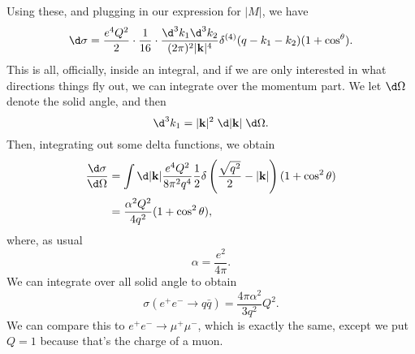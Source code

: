 \documentclass[a4paper]{article}
\begin{document}
Using these, and plugging in our expression for $|M|$, we have
\[
  \d \sigma = \frac{e^4 Q^2}{2} \cdot \frac{1}{16} \cdot \frac{\d^3 k_1 \d^3 k_2}{(2\pi)^2|\mathbf{k}|^4} \delta^{(4)} (q - k_1 - k_2) (1 + \cos^\theta).
\]
This is all, officially, inside an integral, and if we are only interested in what directions things fly out, we can integrate over the momentum part. We let $\d \Omega$ denote the solid angle, and then
\[
  \d^3 k_1 = |\mathbf{k}|^2 \;\d |\mathbf{k}|\;\d \Omega.
\]
Then, integrating out some delta functions, we obtain
\begin{align*}
  \frac{\d \sigma}{\d \Omega} &= \int \d|\mathbf{k}| \frac{e^4 Q^2}{8 \pi^2 q^4} \frac{1}{2} \delta\left(\frac{\sqrt{q^2}}{2} - |\mathbf{k}|\right)(1 + \cos^2 \theta)\\
  &= \frac{\alpha^2 Q^2}{4 q^2} (1 + \cos^2 \theta),
\end{align*}
where, as usual
\[
  \alpha = \frac{e^2}{4\pi}.
\]
We can integrate over all solid angle to obtain
\[
  \sigma(e^+ e^- \to q \bar{q}) = \frac{4\pi \alpha^2}{3 q^2}Q^2.
\]
We can compare this to $e^+ e^- \to \mu^+ \mu^-$, which is exactly the same, except we put $Q = 1$ because that's the charge of a muon.
\end{document}

